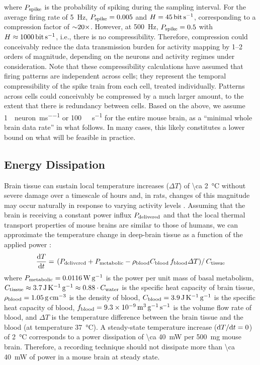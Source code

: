 where $P_{\text{\scriptsize spike}}$ is the probability of spiking during the sampling interval.
For the average firing rate of \SI{5}{\hertz}, $P_{\text{\scriptsize spike}}=0.005$ and $H=\SI{45}{\bit\per\second}$, corresponding to a compression factor of ${\sim} 20\times$.
However, at \SI{500}{\hertz}, $P_{\text{\scriptsize spike}}=0.5$ with $H\approx\SI{1000}{\bit\per\second}$, i.e., there is no compressibility. 
Therefore, compression could conceivably reduce the data transmission burden for activity mapping by 1--2 orders of magnitude, depending on the neurons and activity regimes under consideration. Note that these compressibility calculations have assumed that firing patterns are independent across cells; they represent the temporal compressibility of the spike train from each cell, treated individually. Patterns across cells could conceivably be compressed by a much larger amount, to the extent that there is redundancy between cells. Based on the above, we assume \SI{1}{\bit\per neuron\per\milli\second} or \SI{100}{\giga\bit\per\second} for the entire mouse brain, as a ``minimal whole brain data rate'' in what follows.
In many cases, this likely constitutes a lower bound on what will be feasible in practice.

\subsection{Energy Dissipation}

Brain tissue can sustain local temperature increases ($\Delta T$) of \SI{\ca 2}{\celsius} without severe damage over a timescale of hours and, in rats, changes of this magnitude may occur naturally in response to varying activity levels \cite{Wolf2008}.
Assuming that the brain is receiving a constant power influx $P_{\text{\scriptsize delivered}}$ and that the local thermal transport properties of mouse brains are similar to those of humans, we can approximate the temperature change in deep-brain tissue as a function of the applied power \cite{sotero11, Lazzi2005}:
\[\frac{\text{d} T}{\text{d} t} = \left.\left(P_{\text{\scriptsize delivered}} + P_{\text{\scriptsize metabolic}} - \rho_{\text{\scriptsize blood}} C_{\text{\scriptsize blood}}\,f_{\text{\scriptsize blood}} \Delta T\right)\right/C_{\text{\scriptsize tissue}}\]
where $P_{\text{\scriptsize metabolic}} = \SI{0.0116}{\watt\per\gram}$ is the power per unit mass of basal metabolism, $C_{\text{\scriptsize tissue}} \approx \SI{3.7}{\joule\per\kelvin\per\gram} \approx 0.88\cdot C_{\text{\scriptsize water}}$ is the specific heat capacity of brain tissue, $\rho_{\text{\scriptsize blood}}=\SI{1.05}{\gram\per\centi\meter\cubed}$ is the density of blood, $C_{\text{\scriptsize blood}} = \SI{3.9}{\joule\per\kelvin\per\gram}$ is the specific heat capacity of blood, $f_{\text{\scriptsize blood}} = \SI{9.3e-9}{\meter\cubed\per\gram\per\second}$ is the volume flow rate of blood, and $\Delta T$ is the temperature difference between the brain tissue and the blood (at temperature \SI{37}{\celsius}).
A steady-state temperature increase ($\text{d} T/\text{d} t = 0$) of \SI{2}{\celsius} corresponds to a power dissipation of \SI{\ca 40}{\milli\watt} per \SI{500}{\milli\gram} mouse brain.
Therefore, a recording technique should not dissipate more than \SI{\ca 40}{\milli\watt} of power in a mouse brain at steady state.

